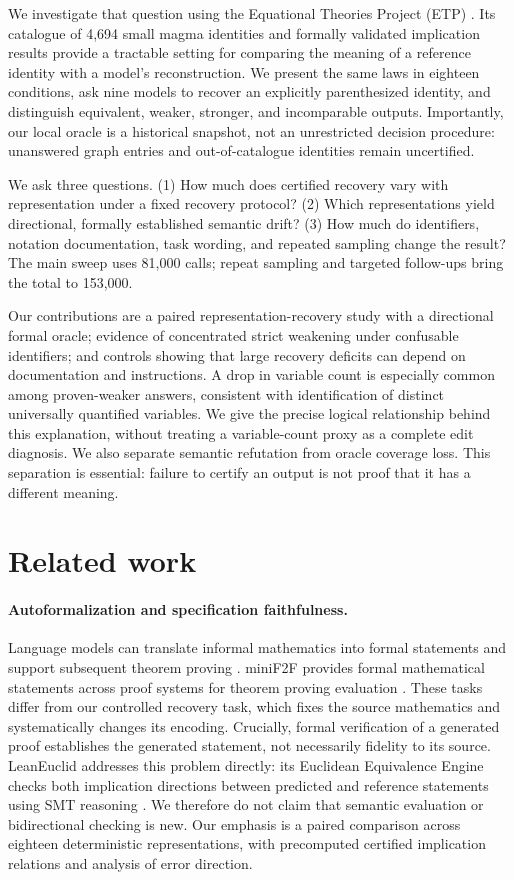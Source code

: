 \documentclass{article}
\begin{document}
We investigate that question using the Equational Theories Project (ETP)
\citep{bolan2025etp}. Its catalogue of 4,694 small magma identities and formally
validated implication results provide a tractable setting for comparing the
meaning of a reference identity with a model's reconstruction. We present the
same laws in eighteen conditions, ask nine models to recover an explicitly
parenthesized identity, and distinguish equivalent, weaker, stronger, and
incomparable outputs. Importantly, our local oracle is a historical snapshot,
not an unrestricted decision procedure: unanswered graph entries and
out-of-catalogue identities remain uncertified.

We ask three questions. (1) How much does certified recovery vary with
representation under a fixed recovery protocol? (2) Which representations yield
directional, formally established semantic drift? (3) How much do identifiers,
notation documentation, task wording, and repeated sampling change the result?
The main sweep uses 81,000 calls; repeat sampling and targeted follow-ups bring
the total to 153,000.

Our contributions are a paired representation-recovery study with a directional
formal oracle; evidence of concentrated strict weakening under confusable
identifiers; and controls showing that large recovery deficits can depend on
documentation and instructions. A drop in variable count is especially common
among proven-weaker answers, consistent with identification of distinct
universally quantified variables. We give the precise logical relationship
behind this explanation, without treating a variable-count proxy as a complete
edit diagnosis. We also separate semantic refutation from oracle coverage loss.
This separation is essential: failure to certify an output is not proof that it
has a different meaning.

\section{Related work}
\label{sec:related}

\paragraph{Autoformalization and specification faithfulness.}
Language models can translate informal mathematics into formal statements and
support subsequent theorem proving \citep{wu2022autoformalization}.
miniF2F provides formal mathematical statements across proof systems for theorem
proving evaluation \citep{zheng2022minif2f}. These tasks differ from our controlled
recovery task, which fixes the source mathematics and systematically changes its
encoding. Crucially, formal verification of a generated proof establishes the
generated statement, not necessarily fidelity to its source.
LeanEuclid addresses this problem directly: its Euclidean Equivalence Engine
checks both implication directions between predicted and reference statements
using SMT reasoning \citep{murphy2024geometry}. We therefore do not claim that
semantic evaluation or bidirectional checking is new. Our emphasis is a paired
comparison across eighteen deterministic representations, with precomputed
certified implication relations and analysis of error direction.
\end{document}
